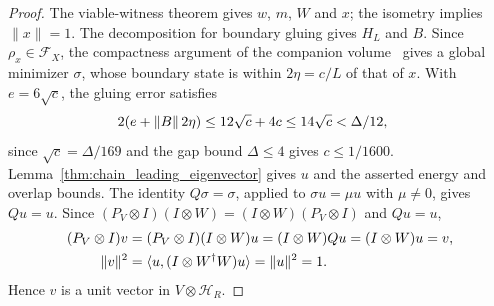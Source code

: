 \begin{proof}\leanok
    The viable-witness theorem gives $w$, $m$, $W$ and $x$; the isometry
    implies $\|x\|=1$. The decomposition for boundary gluing gives $H_L$ and $B$.
    Since $\rho_x\in\mathcal F_X$, the compactness argument of the
    companion volume~\cite[``A minimizing left density matrix'']{QICLean2026Blueprint}
    gives a global minimizer $\sigma$, whose boundary state is within
    $2\eta=c/L$ of that of $x$.
    With $e=6\sqrt c$, the gluing error satisfies
    \begin{align}
        2(e+\|B\|\,2\eta) & \le12\sqrt c+4c
        \le14\sqrt c<\Delta/12,\notag
    \end{align}
    since $\sqrt c=\Delta/169$ and the gap bound $\Delta\le4$ gives
    $c\le1/1600$.
    Lemma~\ref{thm:chain_leading_eigenvector} gives $u$ and the asserted
    energy and overlap bounds. The identity $Q\sigma=\sigma$, applied
    to $\sigma u=\mu u$ with $\mu\ne0$, gives $Qu=u$.
    Since $(P_V\otimes I)(I\otimes W)=(I\otimes W)(P_V\otimes I)$
    and $Qu=u$,
    \begin{align}
        (P_V\otimes I)v & =(P_V\otimes I)(I\otimes W)u
        =(I\otimes W)Qu=(I\otimes W)u=v,\notag                      \\
        \|v\|^2         & =\langle u,(I\otimes W^\dagger W)u\rangle
        =\|u\|^2=1.\notag
    \end{align}
    Hence $v$ is a unit vector in $V\otimes\mathcal H_R$.
\end{proof}

